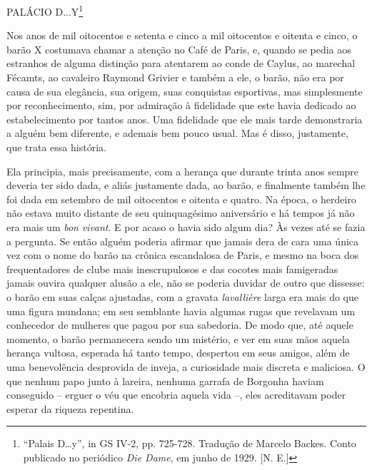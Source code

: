 PALÁCIO D...Y\footnote{``Palais D\ldots{}y'', in GS IV-2, pp. 725-728.
  Tradução de Marcelo Backes. Conto publicado no periódico \emph{Die
  Dame}, em junho de 1929. {[}N. E.{]}}

Nos anos de mil oitocentos e setenta e cinco a mil oitocentos e oitenta
e cinco, o barão X costumava chamar a atenção no Café de Paris, e,
quando se pedia aos estranhos de alguma distinção para atentarem ao
conde de Caylus, ao marechal Fécamts, ao cavaleiro Raymond Grivier e
também a ele, o barão, não era por causa de sua elegância, sua origem,
suas conquistas esportivas, mas simplesmente por reconhecimento, sim,
por admiração à fidelidade que este havia dedicado ao estabelecimento
por tantos anos. Uma fidelidade que ele mais tarde demonstraria a alguém
bem diferente, e ademais bem pouco usual. Mas é disso, justamente, que
trata essa história.

Ela principia, mais precisamente, com a herança que durante trinta anos
sempre deveria ter sido dada, e aliás justamente dada, ao barão, e
finalmente também lhe foi dada em setembro de mil oitocentos e oitenta e
quatro. Na época, o herdeiro não estava muito distante de seu
quinquagésimo aniversário e há tempos já não era mais um \emph{bon}
\emph{vivant}. E por acaso o havia sido algum dia? Às vezes até se fazia
a pergunta. Se então alguém poderia afirmar que jamais dera de cara uma
única vez com o nome do barão na crônica escandalosa de Paris, e mesmo
na boca dos frequentadores de clube mais inescrupulosos e das cocotes
mais famigeradas jamais ouvira qualquer alusão a ele, não se poderia
duvidar de outro que dissesse: o barão em suas calças ajustadas, com a
gravata \emph{lavallière} larga era mais do que uma figura mundana; em
seu semblante havia algumas rugas que revelavam um conhecedor de
mulheres que pagou por sua sabedoria. De modo que, até aquele momento, o
barão permanecera sendo um mistério, e ver em suas mãos aquela herança
vultosa, esperada há tanto tempo, despertou em seus amigos, além de uma
benevolência desprovida de inveja, a curiosidade mais discreta e
maliciosa. O que nenhum papo junto à lareira, nenhuma garrafa de
Borgonha haviam conseguido -- erguer o véu que encobria aquela vida --,
eles acreditavam poder esperar da riqueza repentina.

